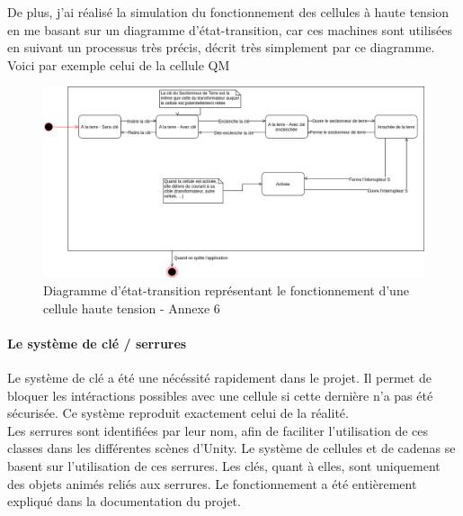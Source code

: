 \documentclass[a4paper]{article}
\begin{document}
    \newpage

    De plus, j'ai réalisé la simulation du fonctionnement des cellules à haute tension en me basant sur un diagramme d'état-transition, car ces machines sont utilisées en suivant un processus très précis, décrit très simplement par ce diagramme. Voici par exemple celui de la cellule QM \\

    \begin{figure}[H]
        \centering
        \includegraphics[scale=0.35]{img/DiagEtatTransitionQM}
        \caption{Diagramme d'état-transition représentant le fonctionnement d'une cellule haute tension - Annexe 6}
    \end{figure} 

    \paragraph{Le système de clé / serrures}

    Le système de clé a été une nécéssité rapidement dans le projet. Il permet de bloquer les intéractions possibles avec une cellule si cette dernière n'a pas été sécurisée. Ce système reproduit exactement celui de la réalité. \\

    Les serrures sont identifiées par leur nom, afin de faciliter l'utilisation de ces classes dans les différentes scènes d'Unity. Le système de cellules et de cadenas se basent sur l'utilisation de ces serrures. Les clés, quant à elles, sont uniquement des objets animés reliés aux serrures. Le fonctionnement a été entièrement expliqué dans la documentation du projet. \\
    
\end{document}
